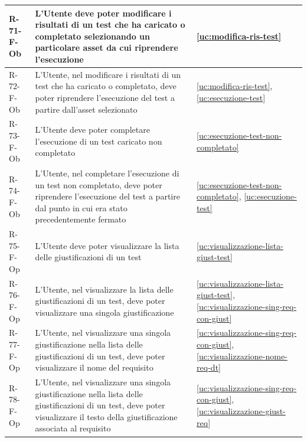 ﻿\documentclass[a4paper,12pt]{article}
\begin{document}
{{\begin{longtable}{|l|p{}|p{}|}
            R-71-F-Ob       & L'Utente deve poter modificare i risultati di un test che ha caricato o completato selezionando un particolare asset da cui riprendere l'esecuzione                                         & \ref{uc:modifica-ris-test}                                               \\ \hline
            R-72-F-Ob       & L'Utente, nel modificare i risultati di un test che ha caricato o completato, deve poter riprendere l'esecuzione del test a partire dall'asset selezionato                                  & \ref{uc:modifica-ris-test}, \ref{uc:esecuzione-test}                       \\ \hline
            R-73-F-Ob       & L'Utente deve poter completare l'esecuzione di un test caricato non completato                                                                                                              & \ref{uc:esecuzione-test-non-completato}                                               \\ \hline
            R-74-F-Ob       & L'Utente, nel completare l'esecuzione di un test non completato, deve poter riprendere l'esecuzione del test a partire dal punto in cui era stato precedentemente fermato                   & \ref{uc:esecuzione-test-non-completato}, \ref{uc:esecuzione-test}                       \\ \hline
            R-75-F-Op       & L'Utente deve poter visualizzare la lista delle giustificazioni di un test                                                                                                                  & \ref{uc:visualizzazione-lista-giust-test}                                               \\ \hline
            R-76-F-Op       & L'Utente, nel visualizzare la lista delle giustificazioni di un test, deve poter visualizzare una singola giustificazione                                                                   & \ref{uc:visualizzazione-lista-giust-test}, \ref{uc:visualizzazione-sing-req-con-giust}                 \\ \hline
            R-77-F-Op       & L'Utente, nel visualizzare una singola giustificazione nella lista delle giustificazioni di un test, deve poter visualizzare il nome del requisito                                          & \ref{uc:visualizzazione-sing-req-con-giust}, \ref{uc:visualizzazione-nome-req-dt}             \\ \hline
            R-78-F-Op       & L'Utente, nel visualizzare una singola giustificazione nella lista delle giustificazioni di un test, deve poter visualizzare il testo della giustificazione associata al requisito          & \ref{uc:visualizzazione-sing-req-con-giust}, \ref{uc:visualizzazione-giust-req}         \\ \hline

\end{longtable}}}
\end{document}
